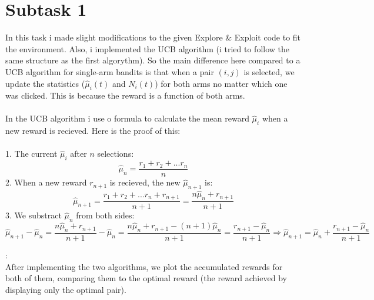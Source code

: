 \documentclass{article}
\begin{document}
\section*{Subtask 1}
In this task i made slight modifications to the given 
Explore \& Exploit code to fit the environment. 
Also, i implemented the UCB algorithm (i tried to follow the same structure
as the first algorythm). So the main difference here compared to a 
UCB algorithm for single-arm bandits is that when a pair $(i,j)$ is selected,
we update the statistics ($\hat{\mu}_{i}(t)$ and $N_i(t)$) for both arms no 
matter which one was clicked. This is because the reward is a function of both arms.\\\\
In the UCB algorithm i use o formula to calculate
the mean reward {$\hat{\mu}_{i}$} when a new reward is recieved. 
Here is the proof of this:\\\\
1. The current $\hat{\mu}_{i}$ after $n$ selections:
\[
    \hat{\mu}_{n} = \frac{r_1+r_2+...r_n}{n}
\]
2. When a new reward $r_{n+1}$ is recieved, the new $\hat{\mu}_{n+1}$ is:
\[
    \hat{\mu}_{n+1} = \frac{r_1+r_2+...r_n+r_{n+1}}{n+1}=
    \frac{n\hat{\mu}_{n}+r_{n+1}}{n+1}
\]
3. We substract $\hat{\mu}_{n}$ from both sides:
\[
    \hat{\mu}_{n+1} - \hat{\mu}_{n} = \frac{n\hat{\mu}_{n}+r_{n+1}}{n+1} - \hat{\mu}_{n}=
    \frac{n\hat{\mu}_{n}+r_{n+1} - (n+1)\hat{\mu}_{n}}{n+1}=
    \frac{r_{n+1} - \hat{\mu}_{n}}{n+1} \Rightarrow
    \boxed{\hat{\mu}_{n+1} = \hat{\mu}_{n} + \frac{r_{n+1} - \hat{\mu}_{n}}{n+1}}
\]  

\newpage

:\\
\noindent After implementing the two algorithms, we 
plot the accumulated rewards for both of them, comparing them to 
the optimal reward (the reward achieved by displaying only the optimal pair).
\end{document}

